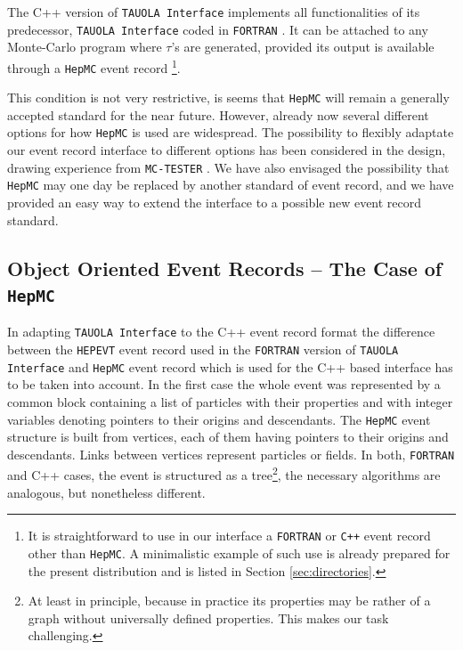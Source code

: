 \documentclass[]{Tauola_interface_design}
\begin{document}
The C++ version of {\tt TAUOLA Interface} implements all functionalities
of its predecessor, {\tt TAUOLA  Interface} coded in  {\tt FORTRAN} \cite{Golonka:2003xt}.
It can be attached to any Monte-Carlo program where $\tau$'s
are generated, provided its output is available through a {\tt HepMC} \cite{Dobbs:2001ck} event record%
\footnote{It is straightforward to use in our interface 
a {\tt FORTRAN} or {\tt C++} event record other than {\tt HepMC}.
A minimalistic example of such use is already prepared for the present distribution and
is listed in Section \ref{sec:directories}.}.

This condition is not very restrictive, is seems that {\tt HepMC} will
remain a generally accepted standard for the near future. However,
already now several different options for how {\tt HepMC} is used are
widespread. The possibility to flexibly adaptate our event record 
interface to different
options has been considered in the design,  drawing experience
from {\tt MC-TESTER} \cite{Golonka:2002rz,Davidson:2008ma}. 
We have also
envisaged the possibility that {\tt HepMC} may one day be replaced by another
standard of event record, and we have provided an easy way to extend
the interface to a possible new event record standard.

\subsection{Object Oriented Event Records  -- The Case of {\tt HepMC}}
In adapting {\tt TAUOLA Interface} to the C++ event record format
 the difference between the {\tt HEPEVT} event record used in the {\tt FORTRAN}
version of {\tt TAUOLA Interface} and  {\tt HepMC} event record  
which is used for the C++ based interface
has to be taken into account. 
In the first case the whole event was represented
by a common block containing a list of particles with their properties and
with integer 
variables denoting pointers to their origins and descendants.
 The {\tt HepMC} event structure
is built from vertices, each of them having pointers to their origins and descendants. Links between vertices represent particles or fields.
 In both, {\tt FORTRAN} and C++  
cases, the event is structured as 
a tree\footnote{At least in principle, because in practice its properties
may be rather of a graph without universally defined properties.
This makes our task challenging.}, the necessary algorithms are  analogous, 
but nonetheless different.
\end{document}
